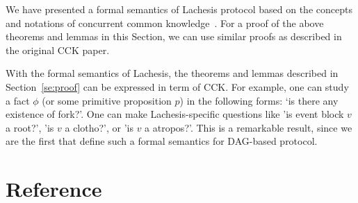 \documentclass{article}
\begin{document}
We have presented a formal semantics of Lachesis protocol based on the concepts and notations of concurrent common knowledge~\cite{cck92}.
For a proof of the above theorems and lemmas in this Section, we can use similar proofs as described in the original CCK paper.
 

With the formal semantics of Lachesis, the theorems and lemmas described in Section~\ref{se:proof} can be expressed in term of CCK. For example, one can study a fact $\phi$ (or some primitive proposition $p$) in the following forms: `is there any existence of fork?'. One can make Lachesis-specific questions like 'is event block $v$ a root?', 'is $v$ a clotho?', or 'is $v$ a atropos?'. This is a remarkable result, since we are the first that define such a formal semantics for DAG-based protocol. 





\clearpage
\section{Reference}\label{se:ref}

\renewcommand\refname{\vskip -1cm}
%
%


\end{document}
